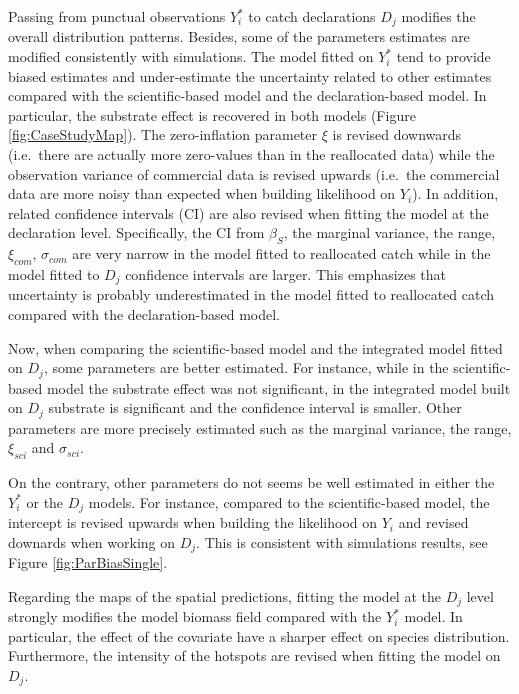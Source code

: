 \documentclass[
  english,
  man]{apa6}
\begin{document}
Passing from punctual observations \(Y_i^*\) to catch declarations \(D_j\) modifies the overall distribution patterns. Besides, some of the parameters estimates are modified consistently with simulations. The model fitted on \(Y_i^*\) tend to provide biased estimates and under-estimate the uncertainty related to other estimates compared with the scientific-based model and the declaration-based model. In particular, the substrate effect is recovered in both models (Figure \ref{fig:CaseStudyMap}). The zero-inflation parameter \(\xi\) is revised downwards (i.e.~there are actually more zero-values than in the reallocated data) while the observation variance of commercial data is revised upwards (i.e.~the commercial data are more noisy than expected when building likelihood on \(Y_i\)). In addition, related confidence intervals (CI) are also revised when fitting the model at the declaration level. Specifically, the CI from \(\beta_S\), the marginal variance, the range, \(\xi_{com}\), \(\sigma_{com}\) are very narrow in the model fitted to reallocated catch while in the model fitted to \(D_j\) confidence intervals are larger. This emphasizes that uncertainty is probably underestimated in the model fitted to reallocated catch compared with the declaration-based model.

Now, when comparing the scientific-based model and the integrated model fitted on \(D_j\), some parameters are better estimated. For instance, while in the scientific-based model the substrate effect was not significant, in the integrated model built on \(D_j\) substrate is significant and the confidence interval is smaller. Other parameters are more precisely estimated such as the marginal variance, the range, \(\xi_{sci}\) and \(\sigma_{sci}\).

On the contrary, other parameters do not seems be well estimated in either the \(Y_i^*\) or the \(D_j\) models. For instance, compared to the scientific-based model, the intercept is revised upwards when building the likelihood on \(Y_i\) and revised downards when working on \(D_j\). This is consistent with simulations results, see Figure \ref{fig:ParBiasSingle}.

Regarding the maps of the spatial predictions, fitting the model at the \(D_j\) level strongly modifies the model biomass field compared with the \(Y_i^*\) model. In particular, the effect of the covariate have a sharper effect on species distribution. Furthermore, the intensity of the hotspots are revised when fitting the model on \(D_j\).
\end{document}
